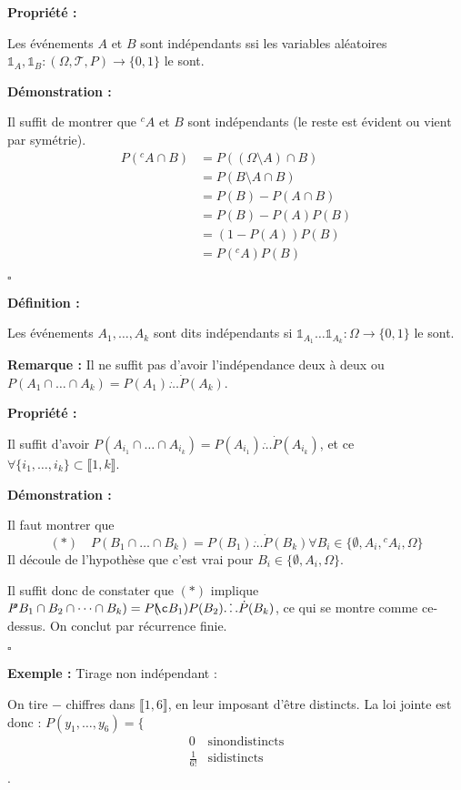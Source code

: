 \documentclass[10pt,a4paper,notitlepage ]{article}
\newenvironment{definition}{
	
	\textbf{Définition : }
}
{}
\newenvironment{propriete}{
	\begin{tcolorbox}
		\textbf{Propriété : }
}
{\end{tcolorbox}}
\newenvironment{demo}{

	\textbf{Démonstration :}
}{\begin{flushright}
	$\square$
\end{flushright}
}
\newenvironment{exemple}{
	
	\textbf{Exemple :} }{}
\newenvironment{rem}{
	
	\textbf{Remarque :}}{}
\begin{document}
\begin{propriete}
	Les événements $A$ et $B$ sont indépendants ssi les variables aléatoires $\mathds{1}_A, \mathds{1}_B : (\Omega, \mathcal T, P) \rightarrow \{0,1\}$ le sont.
\end{propriete}

\begin{demo}
	Il suffit de montrer que $\!\!^cA$ et $B$ sont indépendants (le reste est évident ou vient par symétrie).
	\begin{align*}
		P(\!\!^cA\cap B) &= P((\Omega \setminus A) \cap B) \\
		&= P(B \setminus A\cap B) \\
		&= P(B) - P(A\cap B) \\
		&= P(B) - P(A)P(B) \\
		&= (1-P(A))P(B) \\
		&= P(\!\!^cA)P(B)
	\end{align*} 
\end{demo}

\begin{definition}
	Les événements $A_1,\dots,A_k$ sont dits indépendants si $\mathds 1_{A_1} \dots \mathds 1_{A_k} : \Omega \rightarrow \{0,1\}$ le sont.
\end{definition}

\begin{rem}
	Il ne suffit pas d'avoir l'indépendance deux à deux ou $P(A_1 \cap \dots \cap A_k) = P(A_1) \dot \dots \dot P(A_k)$.
\end{rem}

\begin{propriete}
	Il suffit d'avoir $P(A_{i_1} \cap \dots \cap A_{i_k}) = P(A_{i_1}) \dot \dots \dot P(A_{i_k})$, et ce $\forall \{i_1, \dots, i_k\} \subset \llbracket 1,k \rrbracket$.
\end{propriete}

\begin{demo}
	Il faut montrer que
	\[ (*) \quad P(B_1 \cap \dots \cap B_k) = P(B_1) \dot \dots \dot P(B_k) \forall B_i \in \{\emptyset, A_i, \!\!^cA_i, \Omega\}	\]
	Il découle de l'hypothèse que c'est vrai pour $B_i \in \{ \emptyset, A_i, \Omega\}$.
	
	Il suffit donc de constater que $(*)$ implique $P\!\!^cB_1 \cap B_2 \cap \dots \cap B_k) = P(\!\!\c B_1)P(B_2) \dot \dots \dot P(B_k)$, ce qui se montre comme ce-dessus. On conclut par récurrence finie.
\end{demo}

\begin{exemple}
	Tirage non indépendant :
	
	On tire $-$ chiffres dans $\llbracket 1,6 \rrbracket$, en leur imposant d'être distincts. La loi jointe est donc : $P(y_1, \dots, y_6) = \{$ \begin{align*}
		0 &\mathrm{si non distincts} \\
		\frac{1}{6!} &\mathrm{si distincts}
	\end{align*}.
\end{exemple}
\end{document}
